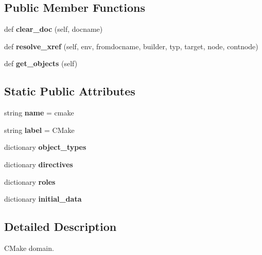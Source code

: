 \subsection*{Public Member Functions}
\begin{DoxyCompactItemize}
\item 
\mbox{\label{classcmake_1_1CMakeDomain_a2732fd39e980ef6d09b25eb900e5c4e4}} 
def {\bfseries clear\+\_\+doc} (self, docname)
\item 
\mbox{\label{classcmake_1_1CMakeDomain_a7c0d75227bf1e1745d43f6e19943b624}} 
def {\bfseries resolve\+\_\+xref} (self, env, fromdocname, builder, typ, target, node, contnode)
\item 
\mbox{\label{classcmake_1_1CMakeDomain_a0f5f539734ddf67f8ecf8dafe6003cd6}} 
def {\bfseries get\+\_\+objects} (self)
\end{DoxyCompactItemize}
\subsection*{Static Public Attributes}
\begin{DoxyCompactItemize}
\item 
\mbox{\label{classcmake_1_1CMakeDomain_a1f6d8b71882c94a479574702ce0428f1}} 
string {\bfseries name} = \textquotesingle{}cmake\textquotesingle{}
\item 
\mbox{\label{classcmake_1_1CMakeDomain_a9215bbd38d25d788734f83dfc8c7f2bd}} 
string {\bfseries label} = \textquotesingle{}C\+Make\textquotesingle{}
\item 
dictionary {\bfseries object\+\_\+types}
\item 
dictionary {\bfseries directives}
\item 
dictionary {\bfseries roles}
\item 
dictionary {\bfseries initial\+\_\+data}
\end{DoxyCompactItemize}


\subsection{Detailed Description}
C\+Make domain. 



